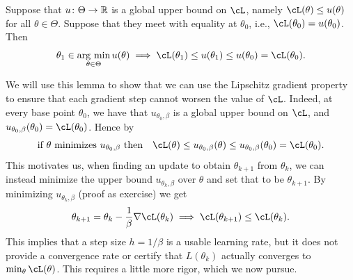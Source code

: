 \documentclass[../../book-main.tex]{subfiles}
\begin{document}
\begin{lemma}\label{lem:majorization_minimization}
    Suppose that \(u \colon \Theta \to \mathbb{R}\) is a global upper bound on \(\cL\), namely \(\cL(\theta) \leq u(\theta)\) for all \(\theta \in \Theta\). Suppose that they meet with equality at \(\theta_{0}\), i.e., \(\cL(\theta_{0}) = u(\theta_{0})\). Then
    \begin{equation}
        \theta_{1} \in \argmin_{\theta \in \Theta}u(\theta) \implies \cL(\theta_{1}) \leq u(\theta_{1}) \leq u(\theta_{0}) = \cL(\theta_{0}).
    \end{equation}
\end{lemma}

We will use this lemma to show that we can use the Lipschitz gradient property to ensure that each gradient step cannot worsen the value of \(\cL\). Indeed, at every base point \(\theta_{0}\), we have that \(u_{\theta_{0}, \beta}\) is a global upper bound on \(\cL\), and \(u_{\theta_{0}, \beta}(\theta_{0}) = \cL(\theta_{0})\). Hence by 
\begin{equation}
    \text{if \(\theta\) minimizes \(u_{\theta_{0}, \beta}\) then} \quad \cL(\theta) \leq u_{\theta_{0}, \beta}(\theta) \leq u_{\theta_{0}, \beta}(\theta_{0}) = \cL(\theta_{0}).
\end{equation}
This motivates us, when finding an update to obtain \(\theta_{k + 1}\) from \(\theta_{k}\), we can instead minimize the upper bound \(u_{\theta_{k}, \beta}\) over \(\theta\) and set that to be \(\theta_{k + 1}\). By minimizing \(u_{\theta_{k}, \beta}\) (proof as exercise) we get 
\begin{equation}
    \theta_{k + 1} = \theta_{k} - \frac{1}{\beta}\nabla \cL(\theta_{k}) \implies \cL(\theta_{k + 1}) \leq \cL(\theta_{k}).
\end{equation}
This implies that a step size \(h = 1/\beta\) is a usable learning rate, but it does not provide a convergence rate or certify that \(L(\theta_{k})\) actually converges to \(\min_{\theta}\cL(\theta)\). This requires a little more rigor, which we now pursue.
\end{document}

